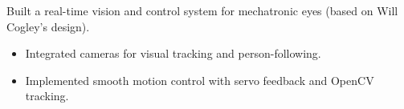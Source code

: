 Built a real-time vision and control system for mechatronic eyes (based on Will Cogley’s design).
\begin{itemize}
\item Integrated cameras for visual tracking and person-following.
\item Implemented smooth motion control with servo feedback and OpenCV tracking.
\end{itemize}
{\LaTeXraggedright
{}
\par}